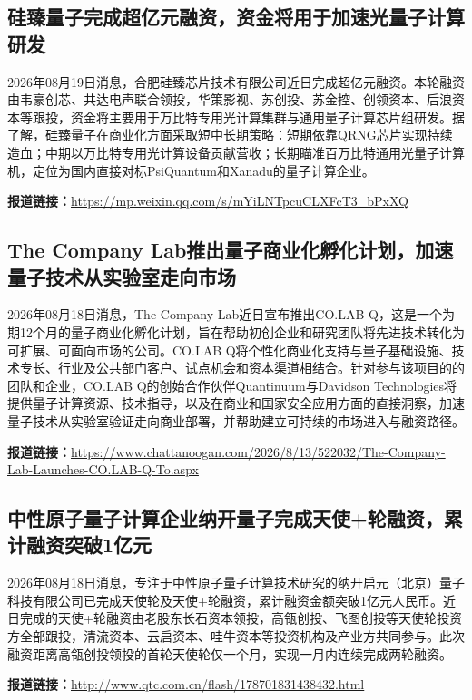 \documentclass[12pt,a4paper]{ctexart}
\begin{document}
\subsection{ 硅臻量子完成超亿元融资，资金将用于加速光量子计算研发 }

2026年08月19日消息，合肥硅臻芯片技术有限公司近日完成超亿元融资。本轮融资由韦豪创芯、共达电声联合领投，华策影视、苏创投、苏金控、创领资本、后浪资本等跟投，资金将主要用于万比特专用光计算集群与通用量子计算芯片组研发。据了解，硅臻量子在商业化方面采取短中长期策略：短期依靠QRNG芯片实现持续造血；中期以万比特专用光计算设备贡献营收；长期瞄准百万比特通用光量子计算机，定位为国内直接对标PsiQuantum和Xanadu的量子计算企业。

\noindent\textbf{报道链接：}\url{https://mp.weixin.qq.com/s/mYiLNTpcuCLXFcT3\_bPxXQ}

\subsection{ The Company Lab推出量子商业化孵化计划，加速量子技术从实验室走向市场 }

2026年08月18日消息，The Company Lab近日宣布推出CO.LAB Q，这是一个为期12个月的量子商业化孵化计划，旨在帮助初创企业和研究团队将先进技术转化为可扩展、可面向市场的公司。CO.LAB Q将个性化商业化支持与量子基础设施、技术专长、行业及公共部门客户、试点机会和资本渠道相结合。针对参与该项目的的团队和企业，CO.LAB Q的创始合作伙伴Quantinuum与Davidson Technologies将提供量子计算资源、技术指导，以及在商业和国家安全应用方面的直接洞察，加速量子技术从实验室验证走向商业部署，并帮助建立可持续的市场进入与融资路径。

\noindent\textbf{报道链接：}\url{https://www.chattanoogan.com/2026/8/13/522032/The-Company-Lab-Launches-CO.LAB-Q-To.aspx}

\subsection{ 中性原子量子计算企业纳开量子完成天使+轮融资，累计融资突破1亿元 }

2026年08月18日消息，专注于中性原子量子计算技术研究的纳开启元（北京）量子科技有限公司已完成天使轮及天使+轮融资，累计融资金额突破1亿元人民币。近日完成的天使+轮融资由老股东长石资本领投，高瓴创投、飞图创投等天使轮投资方全部跟投，清流资本、云启资本、哇牛资本等投资机构及产业方共同参与。此次融资距离高瓴创投领投的首轮天使轮仅一个月，实现一月内连续完成两轮融资。

\noindent\textbf{报道链接：}\url{http://www.qtc.com.cn/flash/178701831438432.html}
\end{document}
